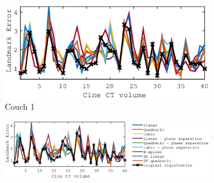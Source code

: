 \documentclass[11pt,a4paper,oneside]{report}
\begin{document}
\begin{figure}
  \begin{subfigure}[b]{0.5\textwidth}
    \includegraphics[width=\textwidth, trim=0 0 0 0,clip=true]{figures/task4/landmark_error_couch1.eps}
    \caption{Couch 1}
  \end{subfigure}%
  \begin{subfigure}[b]{0.32\textwidth}
    \includegraphics[width=\textwidth, trim=410 0 0 0,clip=true]{figures/task4/landmark_error_legend.eps}\\
  \end{subfigure}%
  

\end{figure}
\end{document}
